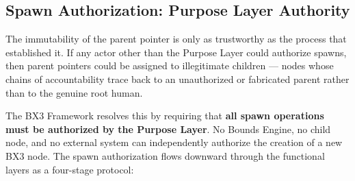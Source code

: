 \subsection{Spawn Authorization: Purpose Layer Authority}
\label{sec:spawn-authorization}

The immutability of the parent pointer is only as trustworthy as the process that established it. If any actor other than the Purpose Layer could authorize spawns, then parent pointers could be assigned to illegitimate children --- nodes whose chains of accountability trace back to an unauthorized or fabricated parent rather than to the genuine root human.

The BX3 Framework resolves this by requiring that \textbf{all spawn operations must be authorized by the Purpose Layer}. No Bounds Engine, no child node, and no external system can independently authorize the creation of a new BX3 node. The spawn authorization flows downward through the functional layers as a four-stage protocol:

